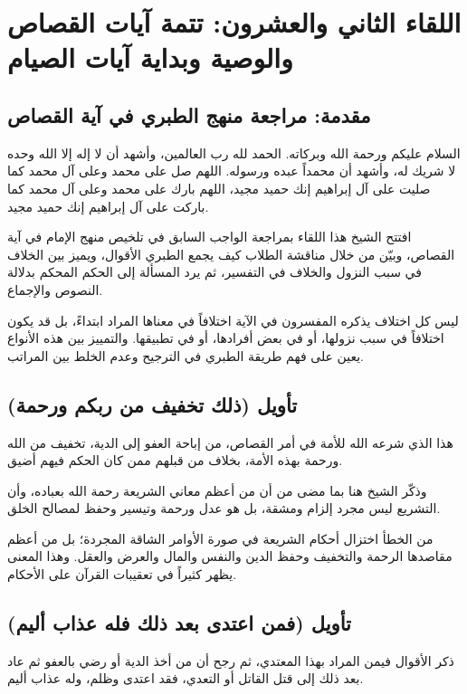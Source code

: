 \chapter{اللقاء الثاني والعشرون: تتمة آيات القصاص والوصية وبداية آيات الصيام}

\section{مقدمة: مراجعة منهج الطبري في آية القصاص}
السلام عليكم ورحمة الله وبركاته. الحمد لله رب العالمين، وأشهد أن لا إله إلا الله وحده لا شريك له، وأشهد أن محمداً عبده ورسوله. اللهم صل على محمد وعلى آل محمد كما صليت على آل إبراهيم إنك حميد مجيد، اللهم بارك على محمد وعلى آل محمد كما باركت على آل إبراهيم إنك حميد مجيد.

افتتح الشيخ هذا اللقاء بمراجعة الواجب السابق في تلخيص منهج الإمام  في آية القصاص، وبيّن من خلال مناقشة الطلاب كيف يجمع الطبري الأقوال، ويميز بين الخلاف في سبب النزول والخلاف في التفسير، ثم يرد المسألة إلى الحكم المحكم بدلالة النصوص والإجماع.

\begin{fawaid}
ليس كل اختلاف يذكره المفسرون في الآية اختلافاً في معناها المراد ابتداءً، بل قد يكون اختلافاً في سبب نزولها، أو في بعض أفرادها، أو في تطبيقها. والتمييز بين هذه الأنواع يعين على فهم طريقة الطبري في الترجيح وعدم الخلط بين المراتب.
\end{fawaid}

\separator

\section{تأويل (ذلك تخفيف من ربكم ورحمة)}
 هذا الذي شرعه الله للأمة في أمر القصاص، من إباحة العفو إلى الدية، تخفيف من الله ورحمة بهذه الأمة، بخلاف من قبلهم ممن كان الحكم فيهم أضيق.

وذكّر الشيخ هنا بما مضى من أن من أعظم معاني الشريعة رحمة الله بعباده، وأن التشريع ليس مجرد إلزام ومشقة، بل هو عدل ورحمة وتيسير وحفظ لمصالح الخلق.

\begin{fawaid}
من الخطأ اختزال أحكام الشريعة في صورة الأوامر الشاقة المجردة؛ بل من أعظم مقاصدها الرحمة والتخفيف وحفظ الدين والنفس والمال والعرض والعقل. وهذا المعنى يظهر كثيراً في تعقيبات القرآن على الأحكام.
\end{fawaid}

\separator

\section{تأويل (فمن اعتدى بعد ذلك فله عذاب أليم)}
ذكر  الأقوال فيمن المراد بهذا المعتدي، ثم رجح أن من أخذ الدية أو رضي بالعفو ثم عاد بعد ذلك إلى قتل القاتل أو التعدي، فقد اعتدى وظلم، وله عذاب أليم.

